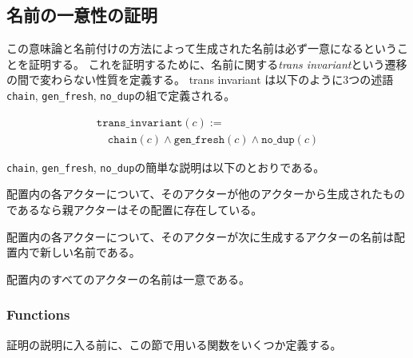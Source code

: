 \subsection{名前の一意性の証明}

この意味論と名前付けの方法によって生成された名前は必ず一意になるということを証明する。
これを証明するために、名前に関する\textit{trans invariant}という遷移の間で変わらない性質を定義する。
trans invariant は以下のように3つの述語\texttt{chain}, \texttt{gen\_fresh}, \texttt{no\_dup}の組で定義される。

\begin{displaymath}
  \begin{array}{l}
    \texttt{trans\_invariant}(c) := \\
    \quad \texttt{chain}(c) \wedge \texttt{gen\_fresh}(c) \wedge \texttt{no\_dup}(c)
  \end{array}
\end{displaymath}

\texttt{chain}, \texttt{gen\_fresh}, \texttt{no\_dup}の簡単な説明は以下のとおりである。

\begin{description}[style=nextline,leftmargin=12pt,parsep=0pt]
\item[\texttt{chain}]
  配置内の各アクターについて、そのアクターが他のアクターから生成されたものであるなら親アクターはその配置に存在している。
\item[\texttt{gen\_fresh}]
  配置内の各アクターについて、そのアクターが次に生成するアクターの名前は配置内で新しい名前である。
\item[\texttt{no\_dup}]
  配置内のすべてのアクターの名前は一意である。
\end{description}

\subsubsection{Functions}

証明の説明に入る前に、この節で用いる関数をいくつか定義する。


